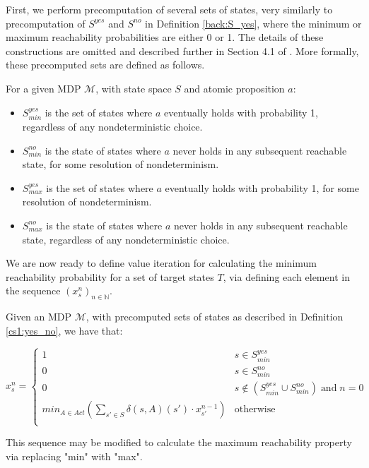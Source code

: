 First, we perform precomputation of several sets of states, very similarly to precomputation of $S^{yes}$ and $S^{no}$ in Definition \ref{back:S_yes}, where the minimum or maximum reachability probabilities are either 0 or 1. The details of these constructions are omitted and described further in Section 4.1 of \cite{forejt_automated_2011}. More formally, these precomputed sets are defined as follows.

\begin{definition}
\label{cs1:yes_no}

For a given MDP $\mathcal{M}$, with state space $S$ and atomic proposition $a$:

\begin{itemize}
    \item $S^{yes}_{min}$ is the set of states where $a$ eventually holds with probability 1, regardless of any nondeterministic choice.
    \item $S^{no}_{min}$ is the state of states where $a$ never holds in any subsequent reachable state, for some resolution of nondeterminism.
    \item $S^{yes}_{max}$ is the set of states where $a$ eventually holds with probability 1, for some resolution of nondeterminism.
    \item $S^{no}_{max}$ is the state of states where $a$ never holds in any subsequent reachable state, regardless of any nondeterministic choice.  
\end{itemize}
\end{definition}

We are now ready to define value iteration for calculating the minimum reachability probability for a set of target states $T$, via defining each element in the sequence $(x^n_s)_{n \in \mathbb{N}}$.

\begin{definition}
\label{cs1:value_iteration}

Given an MDP $\mathcal{M}$, with precomputed sets of states as described in Definition \ref{cs1:yes_no}, we have that:

\begin{equation*}
x^n_s = \begin{cases}
        1 & s \in S^{yes}_{min} \\
        0 & s \in S^{no}_{min} \\
        0 & s \notin (S^{yes}_{min} \cup S^{no}_{min}) \; \text{and} \; n=0 \\
        min_{A \in Act} \left( \sum_{s' \in S}\delta(s,A)(s') \cdot x^{n-1}_{s'} \right) & \text{otherwise} \\
    \end{cases}
\end{equation*}

This sequence may be modified to calculate the maximum reachability property via replacing "min" with "max".
\end{definition}

